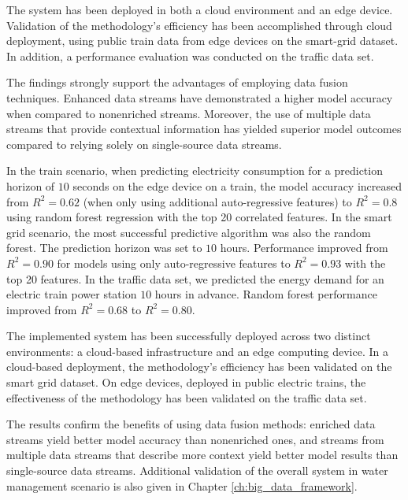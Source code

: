 The system has been deployed in both a cloud environment and an edge device. 
Validation of the methodology's efficiency has been accomplished through cloud deployment, using public train data from edge devices on the smart-grid dataset. In addition, a performance evaluation was conducted on the traffic data set.

The findings strongly support the advantages of employing data fusion techniques. Enhanced data streams have demonstrated a higher model accuracy when compared to nonenriched streams. Moreover, the use of multiple data streams that provide contextual information has yielded superior model outcomes compared to relying solely on single-source data streams.

In the train scenario, when predicting electricity consumption for a prediction horizon of $10$ seconds on the edge device on a train, the model accuracy increased from $R^2=0.62$ (when only using additional auto-regressive features) to $R^2=0.8$ using random forest regression with the top 20 correlated features.
In the smart grid scenario, the most successful predictive algorithm was also the random forest.
The prediction horizon was set to $10$ hours.
Performance improved from $R^2 = 0.90$ for models using only auto-regressive features to $R^2 = 0.93$ with the top 20 features.
In the traffic data set, we predicted the energy demand for an electric train power station $10$ hours in advance.
Random forest performance improved from $R^2 = 0.68$ to $R^2 = 0.80$.

The implemented system has been successfully deployed across two distinct environments: a cloud-based infrastructure and an edge computing device.
In a cloud-based deployment, the methodology's efficiency has been validated on the smart grid dataset. 
On edge devices, deployed in public electric trains, the effectiveness of the methodology has been validated on the traffic data set.

The results confirm the benefits of using data fusion methods: enriched data streams yield better model accuracy than nonenriched ones, and streams from multiple data streams that describe more context yield better model results than single-source data streams.
Additional validation of the overall system in water management scenario is also given in Chapter \ref{ch:big_data_framework}.

